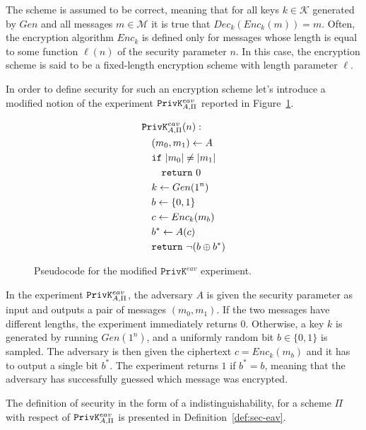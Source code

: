 The scheme is assumed to be correct, meaning that for all keys $k \in \mathcal{K}$ generated by $Gen$ and all messages $m \in \mathcal{M}$ it is true that $Dec_k(Enc_k(m)) = m$. Often, the encryption algorithm $Enc_k$ is defined only for messages whose length is equal to some function $\ell(n)$ of the security parameter $n$. In this case, the encryption scheme is said to be a fixed-length encryption scheme with length parameter $\ell$.

In order to define security for such an encryption scheme let's introduce a modified notion of the experiment $\mathtt{PrivK}^{eav}_{A,\Pi}$ reported in Figure~\ref{fig:privk-eav}.

\begin{figure}[htpb]
    \centering
    \begin{align*}
    &\mathtt{PrivK}^{eav}_{A,\Pi}(n): \\
    &\quad (m_0, m_1) \gets A \\
    &\quad \mathtt{if}\,\,|m_0| \neq |m_1| \\
    &\quad\quad \mathtt{return}\,\,0 \\
    &\quad k \gets Gen(1^n) \\
    &\quad b \gets \{0,1\} \\
    &\quad c \gets Enc_k(m_b) \\
    &\quad b^* \gets A(c) \\
    &\quad \mathtt{return}\,\, \neg(b \oplus b^*)
    \end{align*}
    \caption{Pseudocode for the modified $\mathtt{PrivK}^{eav}$ experiment.}
    \label{fig:privk-eav}
\end{figure}

In the experiment $\mathtt{PrivK}^{eav}_{A,\Pi}$, the adversary $A$ is given the security parameter as input and outputs a pair of messages $(m_0, m_1)$. If the two messages have different lengths, the experiment immediately returns $0$. Otherwise, a key $k$ is generated by running $Gen(1^n)$, and a uniformly random bit $b \in \{0,1\}$ is sampled. The adversary is then given the ciphertext $c = Enc_k(m_b)$ and it has to output a single bit $b^*$. The experiment returns $1$ if $b^* = b$, meaning that the adversary has successfully guessed which message was encrypted.

The definition of security in the form of a indistinguishability, for a scheme $\Pi$ with respect of $\mathtt{PrivK}^{eav}_{A,\Pi}$ is presented in Definition~\ref{def:sec-eav}.

